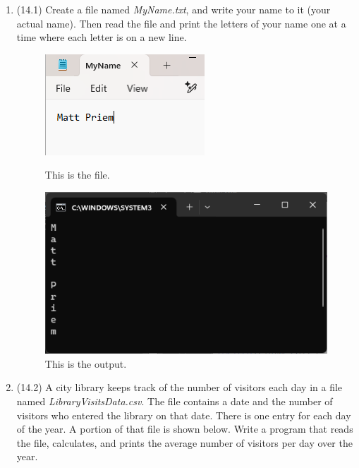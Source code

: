 \documentclass{article}
\begin{document}
\begin{enumerate}
\item (14.1)
		Create a file named \textit{MyName.txt}, and write your name to it (your actual name).	 
		Then read the file and print the letters of your name one at a time where each letter is on a new line.
		\begin{figure}[ht]
			\centering
			\begin{minipage}[b]{.4\textwidth}
				\centering
				\includegraphics[scale=1]{imgs/nameFile.png}
				\caption{This is the file.}	
			\end{minipage}
			\hspace*{2em}
			\begin{minipage}[b]{.4\textwidth}
				\centering
				\includegraphics[width=1\textwidth]{imgs/nameOutput.png}
				\caption{This is the output.}
			\end{minipage}
		\end{figure}


\item (14.2) 
		A city library keeps track of the number of visitors each day in a file named 
		\textit{LibraryVisitsData.csv}.  
		The file contains a date and the number of visitors who entered the library on that date.  
		There is one entry for each day of the year. A portion of that file is shown below.  
		Write a program that reads the file, calculates, and prints the average number of visitors 
		per day over the year.
		

\end{enumerate}
\end{document}
